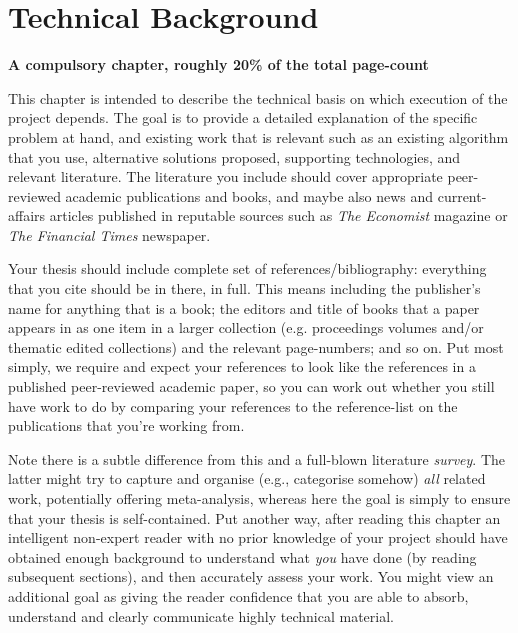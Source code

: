 \documentclass[ %
                    author={Carlos Duran Calle},
                supervisor={Dr. Felipe Campelo},
                    degree={MSc},
                     title={Comparative Machine Learning Analysis for Student Dropout Prediction in a Virtual Learning Environment},
                  subtitle={Incorporating Student Engagement and Socio-Economic Features},
                      type={},
                      year={2025}]{dissertation}
\begin{document}


\chapter{Technical Background}
\label{chap:background}

{\bf A compulsory chapter, roughly 20\% of the total page-count}
\vspace{1cm} 

\noindent
This chapter is intended to describe the technical basis on which execution
of the project depends.  The goal is to provide a detailed explanation of
the specific problem at hand, and existing work that is relevant such as an
existing algorithm that you use, alternative solutions proposed, supporting
technologies, and relevant literature. The literature you include should cover 
appropriate peer-reviewed academic publications and books, and maybe also 
news and current-affairs articles published in reputable sources such as 
{\em The Economist} magazine or {\em The Financial Times} newspaper. 

Your thesis should include complete set of references/bibliography: everything that you cite should be in there, in full. This means including the publisher's name for anything that is a book; the editors and title of books that a paper appears in as one item in a larger collection (e.g. proceedings volumes and/or thematic edited collections) and the relevant page-numbers; and so on. Put most simply, we require and expect your references to look like the references in a published peer-reviewed academic paper, so you can work out whether you still have work to do by comparing your references to the reference-list on the publications that you're working from. 

Note there is a subtle difference from
this and a full-blown literature {\em survey}.  The latter might try
to capture and organise (e.g., categorise somehow) {\em all}\/ related work,
potentially offering meta-analysis, whereas here the goal is simply to
ensure that your thesis is self-contained.  Put another way, after reading 
this chapter an intelligent non-expert reader with no prior knowledge of your project should have obtained enough background to 
understand what {\em you}\/ have done (by reading subsequent sections), and then 
accurately assess your work.  You might view an additional goal as giving 
the reader confidence that you are able to absorb, understand and clearly 
communicate highly technical material.
\end{document}
